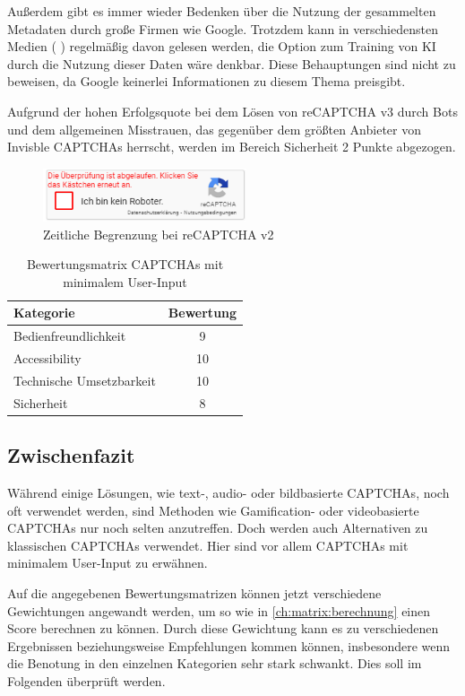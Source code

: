 Außerdem gibt es immer wieder Bedenken über die Nutzung der gesammelten Metadaten durch große Firmen wie Google.
Trotzdem kann in verschiedensten Medien (\cite{sueddt} \cite{hackernoon} \cite{towardsdatascience}) regelmäßig davon gelesen werden,
die Option zum Training von KI durch die Nutzung dieser Daten wäre denkbar.
Diese Behauptungen sind nicht zu beweisen, da Google keinerlei Informationen zu diesem Thema preisgibt.

Aufgrund der hohen Erfolgsquote bei dem Lösen von reCAPTCHA v3 durch Bots 
und dem allgemeinen Misstrauen, das gegenüber dem größten Anbieter von Invisble CAPTCHAs herrscht, 
werden im Bereich Sicherheit 2 Punkte abgezogen.

\begin{figure}[h!]
    \centering\includegraphics[width=6cm]{gfx/mygraphics/recaptchaabgelaufen.png}
     \caption{Zeitliche Begrenzung bei reCAPTCHA v2}
      \label{fig:recaptchaabgelaufen}
\end{figure}

\begin{table}[h!]
    \caption{Bewertungsmatrix CAPTCHAs mit minimalem User-Input}
    \begin{center}
        \begin{tabular}{l|c}
            Kategorie                       & Bewertung \\\hline
            Bedienfreundlichkeit            & 9         \\
            Accessibility                   & 10        \\
            Technische Umsetzbarkeit        & 10         \\
            Sicherheit                      & 8         
        \end{tabular}
    \end{center}
\end{table}

\subsection*{Zwischenfazit}
Während einige Lösungen, wie text-, audio- oder bildbasierte CAPTCHAs, noch oft verwendet werden, 
sind Methoden wie Gamification- oder videobasierte CAPTCHAs nur noch selten anzutreffen.
Doch werden auch Alternativen zu klassischen CAPTCHAs verwendet. Hier sind vor allem CAPTCHAs mit minimalem User-Input zu erwähnen. 

Auf die angegebenen Bewertungsmatrizen können jetzt verschiedene Gewichtungen angewandt werden, um so wie in \autoref{ch:matrix:berechnung} einen Score berechnen zu können.
Durch diese Gewichtung kann es zu verschiedenen Ergebnissen beziehungsweise Empfehlungen kommen können,
insbesondere wenn die Benotung in den einzelnen Kategorien sehr stark schwankt.
Dies soll im Folgenden überprüft werden.